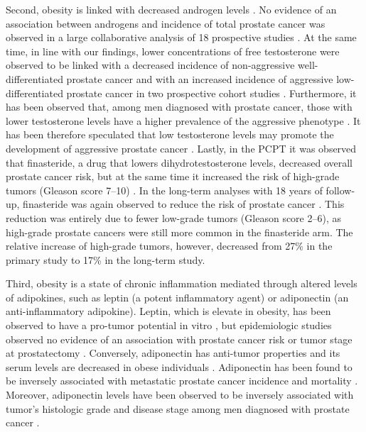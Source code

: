 Second, obesity is linked with decreased androgen levels \citep{lima_decreased_2000}. No evidence of an association between androgens and incidence of total prostate cancer was observed in a large collaborative analysis of 18 prospective studies \citep{endogenoushormonesandprostatecancercollaborativegroup_endogenous_2008}. At the same time, in line with our findings, lower concentrations of free testosterone were observed to be linked with a decreased incidence of non-aggressive well-differentiated prostate cancer and with an increased incidence of aggressive low-differentiated prostate cancer in two prospective cohort studies \citep{platz_sex_2005, severi_circulating_2006}. Furthermore, it has been observed that, among men diagnosed with prostate cancer, those with lower testosterone levels have a higher prevalence of the aggressive phenotype \citep{hoffman_low_2000, schatzl_highgrade_2001, damico_lower_2002, massengill_pretreatment_2003, schnoeller_circulating_2013}. It has been therefore speculated that low testosterone levels may promote the development of aggressive prostate cancer \citep{hsing_obesity_2007, freedland_obesity_2007}. Lastly, in the PCPT it was observed that finasteride, a drug that lowers dihydrotestosterone levels, decreased overall prostate cancer risk, but at the same time it increased the risk of high-grade tumors (Gleason score 7--10) \citep{thompson_influence_2003}. In the long-term analyses with 18 years of follow-up, finasteride was again observed to reduce the risk of prostate cancer \citep{thompson_longterm_2013}. This reduction was entirely due to fewer low-grade tumors (Gleason score 2--6), as high-grade prostate cancers were still more common in the finasteride arm. The relative increase of high-grade tumors, however, decreased from 27\% in the primary study to 17\% in the long-term study. 

Third, obesity is a state of chronic inflammation mediated through altered levels of adipokines, such as leptin (a potent inflammatory agent) or adiponectin (an anti-inflammatory adipokine). Leptin, which is elevate in obesity, has been observed to have a pro-tumor potential in vitro \citep{somasundar_prostate_2004}, but epidemiologic studies observed no evidence of an association with prostate cancer risk or tumor stage at prostatectomy  \citep{freedland_serum_2005, baillargeon_obesity_2006, li_25year_2010}. Conversely, adiponectin has anti-tumor properties and its serum levels are decreased in obese individuals \citep{freedland_adiponectin_2010, dalamaga_role_2012}. Adiponectin has been found to be inversely associated with metastatic prostate cancer incidence and mortality \citep{li_25year_2010}. Moreover, adiponectin levels have been observed to be inversely associated with tumor's histologic grade and disease stage among men diagnosed with prostate cancer \citep{goktas_prostate_2005}.



